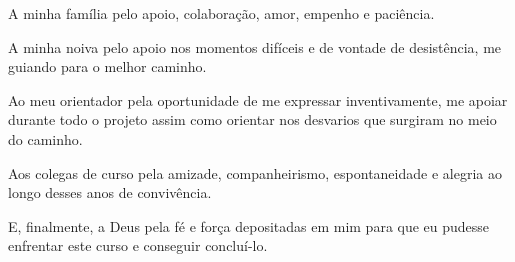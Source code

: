 \begin{agradecimentos}

A minha família pelo apoio, colaboração, amor, empenho e paciência. 

A minha noiva pelo apoio nos momentos difíceis e de vontade de desistência, me guiando para o melhor caminho.

Ao meu orientador pela oportunidade de me expressar inventivamente, me apoiar durante todo o projeto assim como orientar nos desvarios que surgiram no meio do caminho.

Aos colegas de curso pela amizade, companheirismo, espontaneidade e alegria ao longo desses anos de convivência.

E, finalmente, a Deus pela fé e força depositadas em mim para que eu pudesse enfrentar este curso e conseguir concluí-lo.
\end{agradecimentos}
